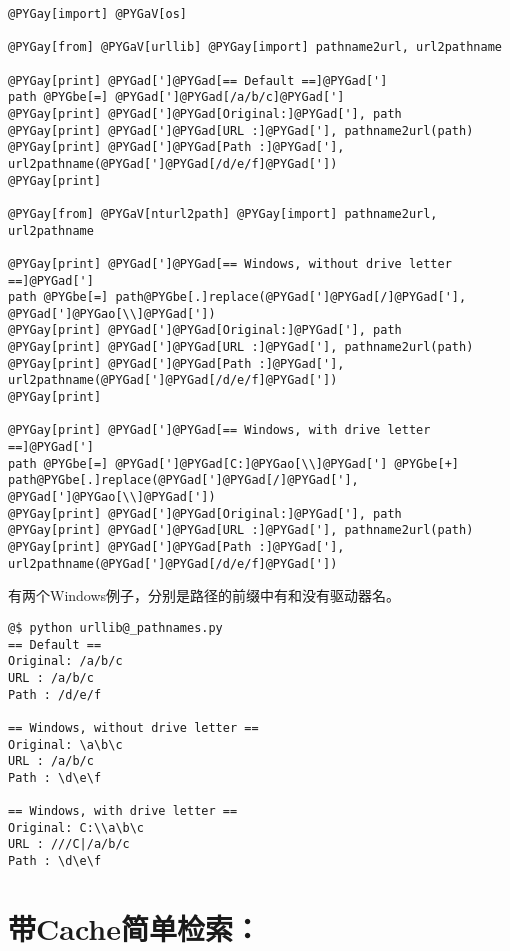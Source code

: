 \documentclass[a4paper,10pt,english]{manual}
\begin{document}
\begin{Verbatim}[commandchars=@\[\]]
@PYGay[import] @PYGaV[os]

@PYGay[from] @PYGaV[urllib] @PYGay[import] pathname2url, url2pathname

@PYGay[print] @PYGad[']@PYGad[== Default ==]@PYGad[']
path @PYGbe[=] @PYGad[']@PYGad[/a/b/c]@PYGad[']
@PYGay[print] @PYGad[']@PYGad[Original:]@PYGad['], path
@PYGay[print] @PYGad[']@PYGad[URL :]@PYGad['], pathname2url(path)
@PYGay[print] @PYGad[']@PYGad[Path :]@PYGad['], url2pathname(@PYGad[']@PYGad[/d/e/f]@PYGad['])
@PYGay[print]

@PYGay[from] @PYGaV[nturl2path] @PYGay[import] pathname2url, url2pathname

@PYGay[print] @PYGad[']@PYGad[== Windows, without drive letter ==]@PYGad[']
path @PYGbe[=] path@PYGbe[.]replace(@PYGad[']@PYGad[/]@PYGad['], @PYGad[']@PYGao[\\]@PYGad['])
@PYGay[print] @PYGad[']@PYGad[Original:]@PYGad['], path
@PYGay[print] @PYGad[']@PYGad[URL :]@PYGad['], pathname2url(path)
@PYGay[print] @PYGad[']@PYGad[Path :]@PYGad['], url2pathname(@PYGad[']@PYGad[/d/e/f]@PYGad['])
@PYGay[print]

@PYGay[print] @PYGad[']@PYGad[== Windows, with drive letter ==]@PYGad[']
path @PYGbe[=] @PYGad[']@PYGad[C:]@PYGao[\\]@PYGad['] @PYGbe[+] path@PYGbe[.]replace(@PYGad[']@PYGad[/]@PYGad['], @PYGad[']@PYGao[\\]@PYGad['])
@PYGay[print] @PYGad[']@PYGad[Original:]@PYGad['], path
@PYGay[print] @PYGad[']@PYGad[URL :]@PYGad['], pathname2url(path)
@PYGay[print] @PYGad[']@PYGad[Path :]@PYGad['], url2pathname(@PYGad[']@PYGad[/d/e/f]@PYGad['])
\end{Verbatim}

有两个Windows例子，分别是路径的前缀中有和没有驱动器名。

\begin{Verbatim}[commandchars=@\[\]]
@$ python urllib@_pathnames.py
== Default ==
Original: /a/b/c
URL : /a/b/c
Path : /d/e/f

== Windows, without drive letter ==
Original: \a\b\c
URL : /a/b/c
Path : \d\e\f

== Windows, with drive letter ==
Original: C:\\a\b\c
URL : ///C|/a/b/c
Path : \d\e\f
\end{Verbatim}


\section{带Cache简单检索：}
\end{document}
